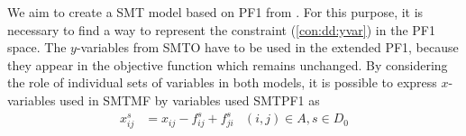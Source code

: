 We aim to create a SMT model based on PF1 from \cite{Polzin}. For this purpose, it is necessary to find a way to represent the constraint (\ref{con:dd:yvar}) in the PF1 space. The $y$-variables from SMTO have to be used in the extended PF1, because they appear in the objective function which remains unchanged. By considering the role of individual sets of variables in both models, it is possible to express $x$-variables used in SMTMF by variables used SMTPF1 as
\begin{subequations}
\begin{align}
\label{eq:tr:xijj}x^s_{ij}&= x_{ij}-f^s_{ij} + f^{s}_{ji} & (i,j)\in A, s\in D_0
\end{align}
\end{subequations}



